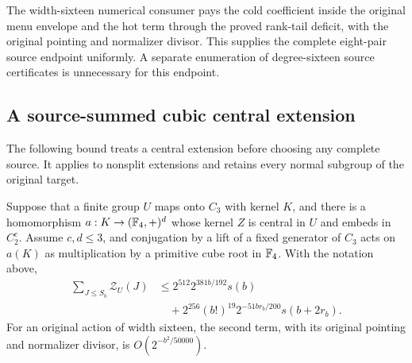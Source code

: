 The width-sixteen numerical consumer pays the cold coefficient inside
the original menu envelope and the hot term through the proved rank-tail
deficit, with the original pointing and normalizer divisor. This supplies
the complete eight-pair source endpoint uniformly. A separate enumeration
of degree-sixteen source certificates is unnecessary for this endpoint.

\subsection{A source-summed cubic central extension}

The following bound treats a central extension before choosing any
complete source. It applies to nonsplit extensions and retains every
normal subgroup of the original target.
\begin{proposition}\label{prop:cubic-central-source}
Suppose that a finite group $U$ maps onto $C_3$ with kernel $K$, and
there is a homomorphism $a:K\to(\mathbb F_4,+)^d$ whose kernel $Z$ is central
in $U$ and embeds in $C_2^c$. Assume $c,d\leq3$, and conjugation by
a lift of a fixed generator of $C_3$ acts on $a(K)$ as multiplication
by a primitive cube root in $\mathbb F_4$. With the notation above,
\begin{align*}
 \sum_{J\leq S_b}\mathcal Z_U(J)
 &\leq 2^{512}2^{381b/192}s(b)\\
 &\quad+2^{256}(b!)^{19}2^{-51br_b/200}s(b+2r_b).
\end{align*}
For an original action of width sixteen, the second term, with its
original pointing and normalizer divisor, is
$O(2^{-b^2/50000})$.
\end{proposition}
